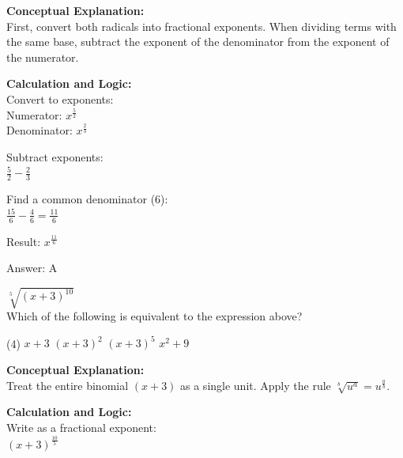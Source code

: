 \documentclass[11pt,paper=a4,answers]{exam}
\begin{document}
\begin{questions}
\begin{solution}
\textbf{Conceptual Explanation:} \\
First, convert both radicals into fractional exponents. When dividing terms with the same base, subtract the exponent of the denominator from the exponent of the numerator.

\vspace{20pt}

\textbf{Calculation and Logic:} \\
Convert to exponents: \\
Numerator: $x^{\frac{5}{2}}$ \\
Denominator: $x^{\frac{2}{3}}$

\vspace{10pt}

Subtract exponents: \\
$\frac{5}{2} - \frac{2}{3}$

\vspace{10pt}

Find a common denominator (6): \\
$\frac{15}{6} - \frac{4}{6} = \frac{11}{6}$

\vspace{10pt}

Result: $x^{\frac{11}{6}}$

\vspace{25pt}

Answer: \colorbox{yellow!100}{A}
\end{solution}

\vspace{40pt}

\question
$\sqrt[5]{(x+3)^{10}}$ \\
Which of the following is equivalent to the expression above?
\begin{tasks}(4)
    \task $x+3$
    \task $(x+3)^2$
    \task $(x+3)^5$
    \task $x^2 + 9$
\end{tasks}

\begin{solution}
\textbf{Conceptual Explanation:} \\
Treat the entire binomial $(x+3)$ as a single unit. Apply the rule $\sqrt[b]{u^a} = u^{\frac{a}{b}}$.

\vspace{20pt}

\textbf{Calculation and Logic:} \\
Write as a fractional exponent: \\
$(x+3)^{\frac{10}{5}}$


\end{solution}
\end{questions}
\end{document}
